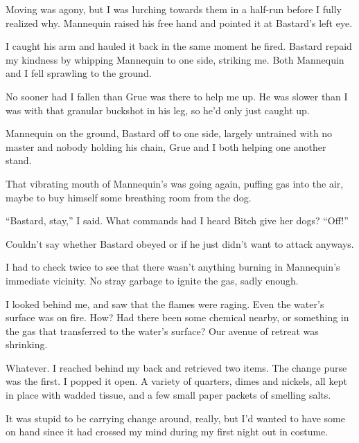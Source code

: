 Moving was agony, but I was lurching towards them in a half-run before I fully realized why.  Mannequin raised his free hand and pointed it at Bastard's left eye.



I caught his arm and hauled it back in the same moment he fired.  Bastard repaid my kindness by whipping Mannequin to one side, striking me.  Both Mannequin and I fell sprawling to the ground.



No sooner had I fallen than Grue was there to help me up.  He was slower than I was with that granular buckshot in his leg, so he'd only just caught up.



Mannequin on the ground, Bastard off to one side, largely untrained with no master and nobody holding his chain, Grue and I both helping one another stand.



That vibrating mouth of Mannequin's was going again, puffing gas into the air, maybe to buy himself some breathing room from the dog.



``Bastard, stay,'' I said.  What commands had I heard Bitch give her dogs?  ``Off!''



Couldn't say whether Bastard obeyed or if he just didn't want to attack anyways.



I had to check twice to see that there wasn't anything burning in Mannequin's immediate vicinity.  No stray garbage to ignite the gas, sadly enough.



I looked behind me, and saw that the flames were raging.  Even the water's surface was on fire.  How?  Had there been some chemical nearby, or something in the gas that transferred to the water's surface?  Our avenue of retreat was shrinking.



Whatever.  I reached behind my back and retrieved two items.  The change purse was the first.  I popped it open.  A variety of quarters, dimes and nickels, all kept in place with wadded tissue, and a few small paper packets of smelling salts.



It was stupid to be carrying change around, really, but I'd wanted to have some on hand since it had crossed my mind during my first night out in costume.



